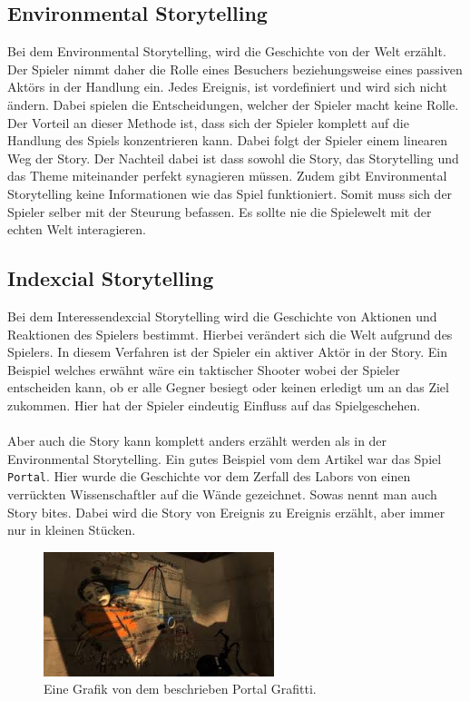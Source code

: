 \subsection{Environmental Storytelling}
Bei dem Environmental Storytelling, wird die Geschichte von der Welt erzählt. Der Spieler nimmt daher die Rolle eines Besuchers beziehungsweise eines passiven Aktörs in der Handlung ein. Jedes Ereignis, ist vordefiniert und wird sich nicht ändern. Dabei spielen die Entscheidungen, welcher der Spieler macht keine Rolle. Der Vorteil an dieser Methode ist, dass sich der Spieler komplett auf die Handlung des Spiels konzentrieren kann. Dabei folgt der Spieler einem linearen Weg der Story. Der Nachteil dabei ist dass sowohl die Story, das Storytelling und das Theme miteinander perfekt synagieren müssen. Zudem gibt Environmental Storytelling keine Informationen wie das Spiel funktioniert. Somit muss sich der Spieler selber mit der Steurung befassen. Es sollte nie die Spielewelt mit der echten Welt interagieren.

\subsection{Indexcial Storytelling}
Bei dem Interessendexcial Storytelling wird die Geschichte von Aktionen und Reaktionen des Spielers bestimmt. Hierbei verändert sich die Welt aufgrund des Spielers. In diesem Verfahren ist der Spieler ein aktiver Aktör in der Story. Ein Beispiel welches  erwähnt wäre ein taktischer Shooter wobei der Spieler entscheiden kann, ob er alle Gegner besiegt oder keinen erledigt um an das Ziel zukommen. Hier hat der Spieler eindeutig Einfluss auf das Spielgeschehen.\\\\
Aber auch die Story kann komplett anders erzählt werden als in der Environmental Storytelling. Ein gutes Beispiel vom dem Artikel  war das Spiel \verb+Portal+. Hier wurde die Geschichte vor dem Zerfall des Labors von einen verrückten Wissenschaftler auf die Wände gezeichnet. Sowas nennt man auch Story bites. Dabei wird die Story von Ereignis zu Ereignis erzählt, aber immer nur in kleinen Stücken.
\begin{figure}[H]
    \centering
    \includegraphics[width=0.6\textwidth]{chapters/15/images/Portal.png}
    \caption{Eine Grafik von dem beschrieben Portal Grafitti.}
    \label{UST-6}
\end{figure}

